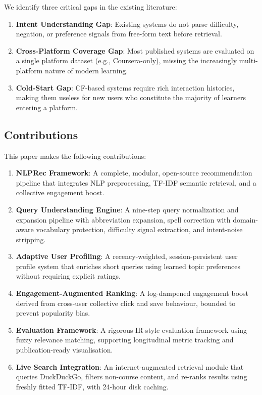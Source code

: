 \documentclass[12pt, a4paper]{article}
\begin{document}
We identify three critical gaps in the existing literature:
\begin{enumerate}[leftmargin=*, label=\arabic*.]
    \item \textbf{Intent Understanding Gap}: Existing systems do not parse difficulty, negation, or
    preference signals from free-form text before retrieval.
    
    \item \textbf{Cross-Platform Coverage Gap}: Most published systems are evaluated on a single
    platform dataset (e.g., Coursera-only), missing the increasingly multi-platform nature of modern
    learning.
    
    \item \textbf{Cold-Start Gap}: CF-based systems require rich interaction histories, making them
    useless for new users who constitute the majority of learners entering a platform.
\end{enumerate}

\subsection{Contributions}

This paper makes the following contributions:

\begin{enumerate}[leftmargin=*, label=\textbf{C\arabic*.}]
    \item \textbf{NLPRec Framework}: A complete, modular, open-source recommendation pipeline that
    integrates NLP preprocessing, TF-IDF semantic retrieval, and a collective engagement boost.
    
    \item \textbf{Query Understanding Engine}: A nine-step query normalization and expansion pipeline
    with abbreviation expansion, spell correction with domain-aware vocabulary protection, difficulty
    signal extraction, and intent-noise stripping.
    
    \item \textbf{Adaptive User Profiling}: A recency-weighted, session-persistent user profile
    system that enriches short queries using learned topic preferences without requiring explicit
    ratings.
    
    \item \textbf{Engagement-Augmented Ranking}: A log-dampened engagement boost derived from
    cross-user collective click and save behaviour, bounded to prevent popularity bias.
    
    \item \textbf{Evaluation Framework}: A rigorous IR-style evaluation framework using fuzzy
    relevance matching, supporting longitudinal metric tracking and publication-ready visualisation.
    
    \item \textbf{Live Search Integration}: An internet-augmented retrieval module that queries
    DuckDuckGo, filters non-course content, and re-ranks results using freshly fitted TF-IDF, with
    24-hour disk caching.
\end{enumerate}
\end{document}
